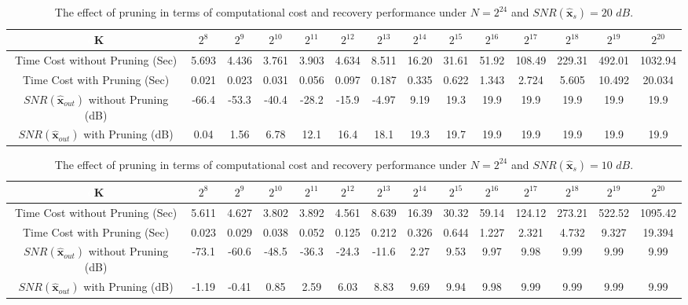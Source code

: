 \documentclass[journal,onecolumn,11pt]{IEEEtran}
\begin{document}
\begin{table}[t]
\fontsize{7.5pt}{1em}\selectfont
\centering
\setlength{\abovecaptionskip}{0pt}
\setlength{\belowcaptionskip}{4pt}
\caption{The effect of pruning in terms of computational cost and recovery performance under $N=2^{24}$ and $SNR(\bm{\hat{x}}_{s})=20$ $dB$.}
\label{Table: pruning comparision 2}
\doublerulesep=2pt
\begin{tabular}[tc]{|c|c|c|c|c|c|c|c|c|c|c|c|c|c|}
\hline
{\LARGE \textcolor{white}{o}}K& $2^{8}$& $2^{9}$& $2^{10}$ & $2^{11}$& $2^{12}$ & $2^{13}$ & $2^{14}$ & $2^{15}$ & $2^{16}$ & $2^{17}$ & $2^{18}$ & $2^{19}$ & $2^{20}$\\ \hline
Time Cost without Pruning (Sec)& 5.693& 4.436& 3.761 & 3.903 & 4.634 & 8.511 & 16.20 & 31.61 & 51.92 & 108.49 & 229.31 & 492.01 &1032.94 \\ \hline
Time Cost with Pruning (Sec)& 0.021&  0.023 & 0.031 & 0.056 & 0.097 & 0.187 & 0.335 & 0.622 & 1.343 & 2.724 & 5.605 & 10.492 &20.034 \\ \hline
$SNR(\bm{\hat{x}}_{out})$ without Pruning (dB)& -66.4& -53.3& -40.4 & -28.2 & -15.9 & -4.97 & 9.19 & 19.3 & 19.9& 19.9& 19.9& 19.9& 19.9 \\ \hline
$SNR(\bm{\hat{x}}_{out})$  with Pruning (dB)& 0.04& 1.56 & 6.78 & 12.1 & 16.4 & 18.1 & 19.3 & 19.7 & 19.9& 19.9& 19.9& 19.9& 19.9 \\ \hline
\end{tabular}
\end{table}

\begin{table}[t]
\fontsize{7.5pt}{1em}\selectfont
\centering
\setlength{\abovecaptionskip}{0pt}
\setlength{\belowcaptionskip}{4pt}
\caption{The effect of pruning in terms of computational cost and recovery performance under $N=2^{24}$ and $SNR(\bm{\hat{x}}_{s})=10$ $dB$.}
\label{Table: pruning comparision 3}
\doublerulesep=2pt
\begin{tabular}[tc]{|c|c|c|c|c|c|c|c|c|c|c|c|c|c|}
\hline
{\LARGE \textcolor{white}{o}}K& $2^{8}$& $2^{9}$& $2^{10}$ & $2^{11}$& $2^{12}$ & $2^{13}$ & $2^{14}$ & $2^{15}$ & $2^{16}$ & $2^{17}$ & $2^{18}$ & $2^{19}$ & $2^{20}$ \\ \hline
Time Cost without Pruning (Sec)& 5.611& 4.627& 3.802 & 3.892 & 4.561 & 8.639 & 16.39 & 30.32 & 59.14& 124.12 & 273.21 & 522.52& 1095.42 \\ \hline
Time Cost with Pruning (Sec)& 0.023&  0.029 & 0.038 & 0.052 & 0.125 & 0.212 & 0.326 & 0.644 & 1.227 & 2.321 & 4.732 & 9.327 & 19.394\\ \hline
$SNR(\bm{\hat{x}}_{out})$ without Pruning (dB)& -73.1& -60.6& -48.5 & -36.3 & -24.3 & -11.6 & 2.27 & 9.53 & 9.97 & 9.98 & 9.99 & 9.99 & 9.99\\ \hline
$SNR(\bm{\hat{x}}_{out})$  with Pruning (dB)& -1.19& -0.41& 0.85 & 2.59 & 6.03 & 8.83 & 9.69 & 9.94 & 9.98 & 9.99 & 9.99 & 9.99 & 9.99  \\ \hline
\end{tabular}
\end{table}
\end{document}
